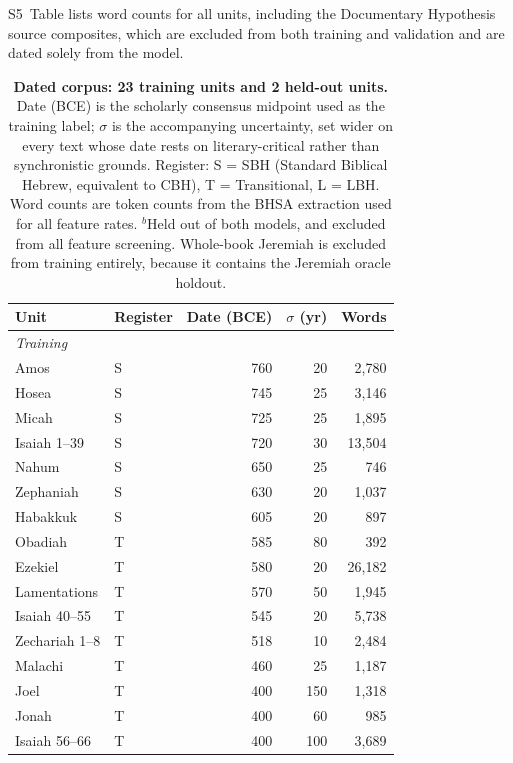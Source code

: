 \documentclass[10pt,letterpaper]{article}
\begin{document}
S5~Table lists word counts for all units, including the Documentary
Hypothesis source composites, which are excluded from both training and
validation and are dated solely from the model.

\begin{table}[!ht]
\centering
\caption{\textbf{Dated corpus: 23 training units and 2 held-out units.}
Date (BCE) is the scholarly consensus midpoint used as the training label;
$\sigma$ is the accompanying uncertainty, set wider on every text whose
date rests on literary-critical rather than synchronistic grounds.  Register: S = SBH (Standard Biblical Hebrew,
equivalent to CBH), T = Transitional, L = LBH.  Word counts are token
counts from the BHSA extraction used for all feature rates.
$^b$Held out of both models, and excluded from all feature screening.
Whole-book Jeremiah is excluded from training entirely, because it
contains the Jeremiah oracle holdout.}
\begin{tabular}{llrrr}
\hline
\textbf{Unit} & \textbf{Register} & \textbf{Date (BCE)} & \textbf{$\sigma$ (yr)} & \textbf{Words} \\
\hline
\multicolumn{5}{l}{\textit{Training}} \\
Amos                  & S & 760 & 20 & 2{,}780 \\
Hosea                 & S & 745 & 25 & 3{,}146 \\
Micah                 & S & 725 & 25 & 1{,}895 \\
Isaiah 1--39          & S & 720 & 30 & 13{,}504 \\
Nahum                 & S & 650 & 25 & 746 \\
Zephaniah             & S & 630 & 20 & 1{,}037 \\
Habakkuk          & S & 605 & 20 & 897 \\
Obadiah               & T & 585 & 80 & 392 \\
Ezekiel               & T & 580 & 20 & 26{,}182 \\
Lamentations          & T & 570 & 50 & 1{,}945 \\
Isaiah 40--55         & T & 545 & 20 & 5{,}738 \\
Zechariah 1--8        & T & 518 & 10 & 2{,}484 \\
Malachi               & T & 460 & 25 & 1{,}187 \\
Joel                  & T & 400 & 150 & 1{,}318 \\
Jonah                 & T & 400 & 60 & 985 \\
Isaiah 56--66         & T & 400 & 100 & 3{,}689 \\

\end{tabular}
\end{table}
\end{document}
